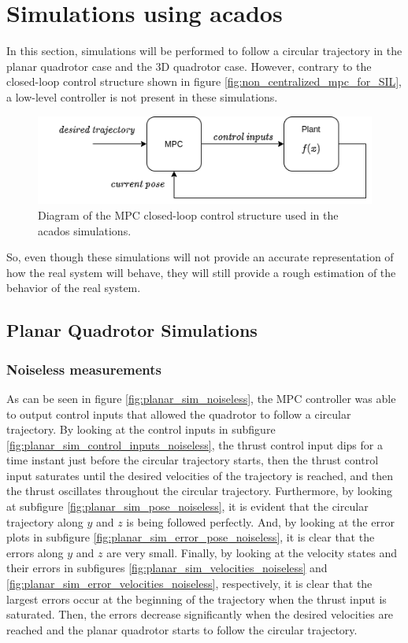 \documentclass{thesisreport}
\begin{document}
\newpage

\section{Simulations using acados}
In this section, simulations will be performed to follow a circular trajectory in the planar quadrotor case and the 3D quadrotor case. However, contrary to the closed-loop control structure shown in figure \ref{fig:non_centralized_mpc_for_SIL}, a low-level controller is not present in these simulations.

\begin{figure}[h]
	\centering
	\includegraphics[width=.7\textwidth]{Images/diagrams/old_sim_rev1.png}
	\caption{Diagram of the MPC closed-loop control structure used in the acados simulations.}
	\label{fig:diagram_acados_simulations}
\end{figure}
 
 So, even though these simulations will not provide an accurate representation of how the real system will behave, they will still provide a rough estimation of the behavior of the real system.
 
\subsection{Planar Quadrotor Simulations}

\subsubsection*{Noiseless measurements}

As can be seen in figure \ref{fig:planar_sim_noiseless}, the MPC controller was able to output control inputs that allowed the quadrotor to follow a circular trajectory. By looking at the control inputs in subfigure \ref{fig:planar_sim_control_inputs_noiseless}, the thrust control input dips for a time instant just before the circular trajectory starts, then the thrust control input saturates until the desired velocities of the trajectory is reached, and then the thrust oscillates throughout the circular trajectory. Furthermore, by looking at subfigure \ref{fig:planar_sim_pose_noiseless}, it is evident that the circular trajectory along $y$ and $z$ is being followed perfectly. And, by looking at the error plots in subfigure \ref{fig:planar_sim_error_pose_noiseless}, it is clear that the errors along $y$ and $z$ are very small. Finally, by looking at the velocity states and their errors in subfigures \ref{fig:planar_sim_velocities_noiseless} and \ref{fig:planar_sim_error_velocities_noiseless}, respectively, it is clear that the largest errors occur at the beginning of the trajectory when the thrust input is saturated. Then, the errors decrease significantly when the desired velocities are reached and the planar quadrotor starts to follow the circular trajectory.
\end{document}
